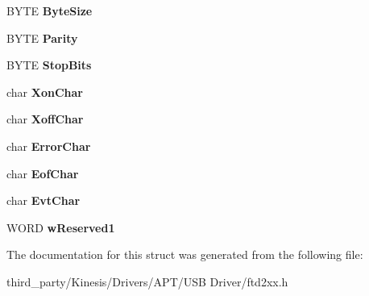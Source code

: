 \begin{DoxyCompactItemize}
\item 
B\+Y\+TE {\bfseries Byte\+Size}\hypertarget{struct___f_t_d_c_b_a6c3cd5d1cae69a2051d8c83badc52780}{}\label{struct___f_t_d_c_b_a6c3cd5d1cae69a2051d8c83badc52780}

\item 
B\+Y\+TE {\bfseries Parity}\hypertarget{struct___f_t_d_c_b_aecaa6eb87d7725f655138a6a6c04c436}{}\label{struct___f_t_d_c_b_aecaa6eb87d7725f655138a6a6c04c436}

\item 
B\+Y\+TE {\bfseries Stop\+Bits}\hypertarget{struct___f_t_d_c_b_a26a8414df8e94f282714833f9776319a}{}\label{struct___f_t_d_c_b_a26a8414df8e94f282714833f9776319a}

\item 
char {\bfseries Xon\+Char}\hypertarget{struct___f_t_d_c_b_aee3e405df31d5b168110814d5529b014}{}\label{struct___f_t_d_c_b_aee3e405df31d5b168110814d5529b014}

\item 
char {\bfseries Xoff\+Char}\hypertarget{struct___f_t_d_c_b_a30a25a1c40525289b24b29f6593a6c51}{}\label{struct___f_t_d_c_b_a30a25a1c40525289b24b29f6593a6c51}

\item 
char {\bfseries Error\+Char}\hypertarget{struct___f_t_d_c_b_a0b8fa24da4dcdba892abd2c6cdb55707}{}\label{struct___f_t_d_c_b_a0b8fa24da4dcdba892abd2c6cdb55707}

\item 
char {\bfseries Eof\+Char}\hypertarget{struct___f_t_d_c_b_a6f0a84ef54dbc36123a40e05ba94aa4e}{}\label{struct___f_t_d_c_b_a6f0a84ef54dbc36123a40e05ba94aa4e}

\item 
char {\bfseries Evt\+Char}\hypertarget{struct___f_t_d_c_b_a579b4755ad4a7ea9c76ddaf5f548a460}{}\label{struct___f_t_d_c_b_a579b4755ad4a7ea9c76ddaf5f548a460}

\item 
W\+O\+RD {\bfseries w\+Reserved1}\hypertarget{struct___f_t_d_c_b_a6775b20a593cc63edde243ed9605a028}{}\label{struct___f_t_d_c_b_a6775b20a593cc63edde243ed9605a028}

\end{DoxyCompactItemize}


The documentation for this struct was generated from the following file\+:\begin{DoxyCompactItemize}
\item 
third\+\_\+party/\+Kinesis/\+Drivers/\+A\+P\+T/\+U\+S\+B Driver/ftd2xx.\+h\end{DoxyCompactItemize}
